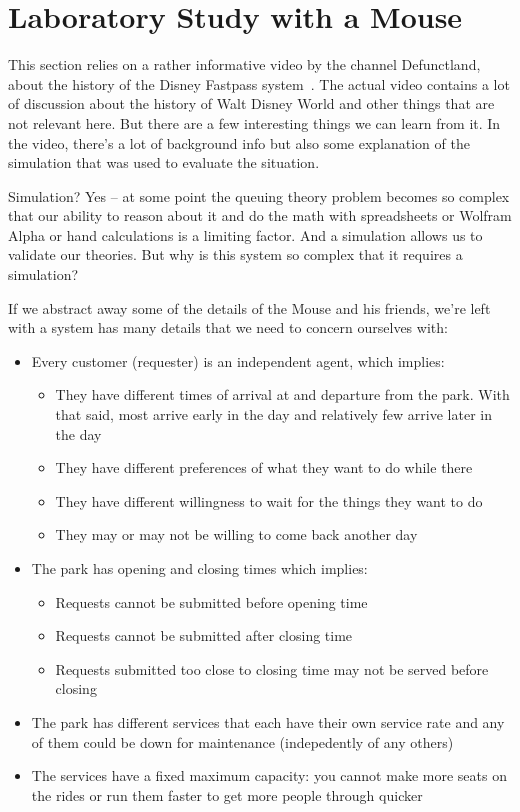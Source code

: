 \documentclass[a4paper]{report}
\begin{document}
\section*{Laboratory Study with a Mouse}

This section relies on a rather informative video by the channel Defunctland, about the history of the Disney Fastpass system~\cite{dldisney}. The actual video contains a lot of discussion about the history of Walt Disney World and other things that are not relevant here. But there are a few interesting things we can learn from it. In the video, there's a lot of background info but also some explanation of the simulation that was used to evaluate the situation.

Simulation? Yes -- at some point the queuing theory problem becomes so complex that our ability to reason about it and do the math with spreadsheets or Wolfram Alpha or hand calculations is a limiting factor. And a simulation allows us to validate our theories. But why is this system so complex that it requires a simulation?

If we abstract away some of the details of the Mouse and his friends, we're left with a system has many details that we need to concern ourselves with:

\begin{itemize}
	\item Every customer (requester) is an independent agent, which implies:
		\begin{itemize}
			\item They have different times of arrival at and departure from the park. With that said, most arrive early in the day and relatively few arrive later in the day
			\item They have different preferences of what they want to do while there
			\item They have different willingness to wait for the things they want to do
			\item They may or may not be willing to come back another day
		\end{itemize}
	\item The park has opening and closing times which implies:
		\begin{itemize}
		\item Requests cannot be submitted before opening time
		\item Requests cannot be submitted after closing time
		\item Requests submitted too close to closing time may not be served before closing
		\end{itemize}
	\item The park has different services that each have their own service rate and any of them could be down for maintenance (indepedently of any others)
	\item The services have a fixed maximum capacity: you cannot make more seats on the rides or run them faster to get more people through quicker
\end{itemize}
\end{document}
